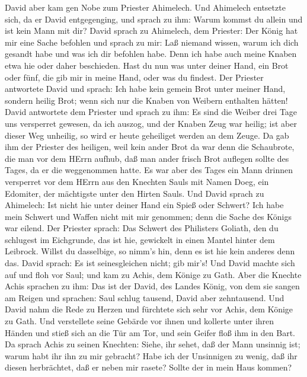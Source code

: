  David aber kam gen Nobe zum Priester Ahimelech. Und
Ahimelech entsetzte sich, da er David entgegenging, und sprach zu ihm:
Warum kommst du allein und ist kein Mann mit dir?  David
sprach zu Ahimelech, dem Priester: Der König hat mir eine Sache befohlen
und sprach zu mir: Laß niemand wissen, warum ich dich gesandt habe und
was ich dir befohlen habe. Denn ich habe auch meine Knaben etwa hie oder
daher beschieden.  Hast du nun was unter deiner Hand, ein
Brot oder fünf, die gib mir in meine Hand, oder was du findest.
 Der Priester antwortete David und sprach: Ich habe kein
gemein Brot unter meiner Hand, sondern heilig Brot; wenn sich nur die
Knaben von Weibern enthalten hätten!  David antwortete dem
Priester und sprach zu ihm: Es sind die Weiber drei Tage uns versperret
gewesen, da ich auszog, und der Knaben Zeug war heilig; ist aber dieser
Weg unheilig, so wird er heute geheiliget werden an dem Zeuge.
 Da gab ihm der Priester des heiligen, weil kein ander Brot
da war denn die Schaubrote, die man vor dem HErrn aufhub, daß man ander
frisch Brot auflegen sollte des Tages, da er die weggenommen hatte.
 Es war aber des Tages ein Mann drinnen versperret vor dem
HErrn aus den Knechten Sauls mit Namen Doeg, ein Edomiter, der
mächtigste unter den Hirten Sauls.  Und David sprach zu
Ahimelech: Ist nicht hie unter deiner Hand ein Spieß oder Schwert? Ich
habe mein Schwert und Waffen nicht mit mir genommen; denn die Sache des
Königs war eilend.  Der Priester sprach: Das Schwert des
Philisters Goliath, den du schlugest im Eichgrunde, das ist hie,
gewickelt in einen Mantel hinter dem Leibrock. Willst du dasselbige, so
nimm's hin, denn es ist hie kein anderes denn das. David sprach: Es ist
seinesgleichen nicht; gib mir's!  Und David machte sich auf
und floh vor Saul; und kam zu Achis, dem Könige zu Gath. 
Aber die Knechte Achis sprachen zu ihm: Das ist der David, des Landes
König, von dem sie sangen am Reigen und sprachen: Saul schlug tausend,
David aber zehntausend.  Und David nahm die Rede zu Herzen
und fürchtete sich sehr vor Achis, dem Könige zu Gath.  Und
verstellete seine Gebärde vor ihnen und kollerte unter ihren Händen und
stieß sich an die Tür am Tor, und sein Geifer floß ihm in den Bart.
 Da sprach Achis zu seinen Knechten: Siehe, ihr sehet, daß
der Mann unsinnig ist; warum habt ihr ihn zu mir gebracht? 
Habe ich der Unsinnigen zu wenig, daß ihr diesen herbrächtet, daß er
neben mir rasete? Sollte der in mein Haus kommen?

